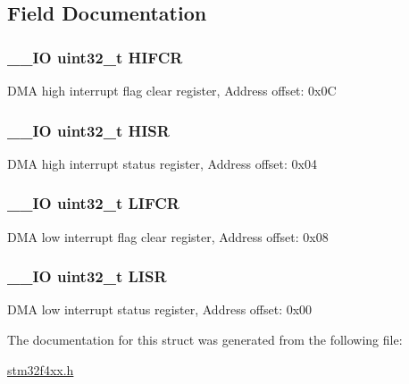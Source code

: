 \subsection{Field Documentation}
\hypertarget{struct_d_m_a___type_def_ac55c27aeea4107813c1e7da3fcf46961}{
\subsubsection[{H\-I\-F\-C\-R}]{\setlength{\rightskip}{0pt plus 5cm}\-\_\-\-\_\-\-I\-O uint32\-\_\-t H\-I\-F\-C\-R}}\label{struct_d_m_a___type_def_ac55c27aeea4107813c1e7da3fcf46961}
D\-M\-A high interrupt flag clear register, Address offset\-: 0x0\-C \hypertarget{struct_d_m_a___type_def_a6fe40f7ac1a18c2726b328b5ec02b262}{
\subsubsection[{H\-I\-S\-R}]{\setlength{\rightskip}{0pt plus 5cm}\-\_\-\-\_\-\-I\-O uint32\-\_\-t H\-I\-S\-R}}\label{struct_d_m_a___type_def_a6fe40f7ac1a18c2726b328b5ec02b262}
D\-M\-A high interrupt status register, Address offset\-: 0x04 \hypertarget{struct_d_m_a___type_def_ac4f7bf4cb172024bfc940c00167cd04e}{
\subsubsection[{L\-I\-F\-C\-R}]{\setlength{\rightskip}{0pt plus 5cm}\-\_\-\-\_\-\-I\-O uint32\-\_\-t L\-I\-F\-C\-R}}\label{struct_d_m_a___type_def_ac4f7bf4cb172024bfc940c00167cd04e}
D\-M\-A low interrupt flag clear register, Address offset\-: 0x08 \hypertarget{struct_d_m_a___type_def_a5cdef358e9e95b570358e1f6a3a7f492}{
\subsubsection[{L\-I\-S\-R}]{\setlength{\rightskip}{0pt plus 5cm}\-\_\-\-\_\-\-I\-O uint32\-\_\-t L\-I\-S\-R}}\label{struct_d_m_a___type_def_a5cdef358e9e95b570358e1f6a3a7f492}
D\-M\-A low interrupt status register, Address offset\-: 0x00 

The documentation for this struct was generated from the following file\-:\begin{DoxyCompactItemize}
\item 
\hyperlink{stm32f4xx_8h}{stm32f4xx.\-h}\end{DoxyCompactItemize}
